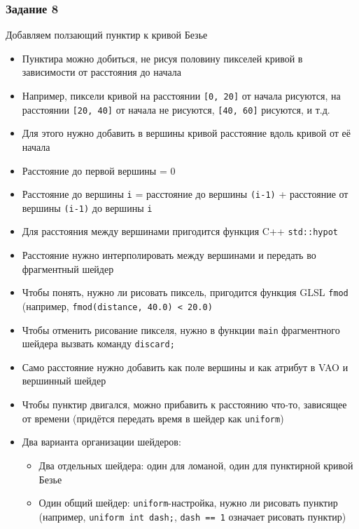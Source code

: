 \documentclass{beamer}
\begin{document}
\begin{frame}[fragile]
\frametitle{Задание 8}
\fontsize{8pt}{8pt}\selectfont
Добавляем ползающий пунктир к кривой Безье
\begin{itemize}
\item Пунктира можно добиться, не рисуя половину пикселей кривой в зависимости от расстояния до начала
\pause
\item Например, пиксели кривой на расстоянии \verb|[0, 20]| от начала рисуются, на расстоянии \verb|[20, 40]| от начала не рисуются, \verb|[40, 60]| рисуются, и т.д.
\pause
\item Для этого нужно добавить в вершины кривой расстояние вдоль кривой от её начала
\item Расстояние до первой вершины = 0
\item Расстояние до  вершины \verb|i| = расстояние до  вершины \verb|(i-1)| + расстояние от вершины \verb|(i-1)| до вершины \verb|i|
\item Для расстояния между вершинами пригодится функция C++ \verb|std::hypot|
\pause
\item Расстояние нужно интерполировать между вершинами и передать во фрагментный шейдер
\item Чтобы понять, нужно ли рисовать пиксель, пригодится функция GLSL \verb|fmod| (например, \verb|fmod(distance, 40.0) < 20.0)|
\item Чтобы отменить рисование пикселя, нужно в функции \verb|main| фрагментного шейдера вызвать команду \verb|discard;|
\pause
\item Само расстояние нужно добавить как поле вершины и как атрибут в VAO и вершинный шейдер
\pause
\item Чтобы пунктир двигался, можно прибавить к расстоянию что-то, зависящее от времени (придётся передать время в шейдер как \verb|uniform|)
\pause
\item Два варианта организации шейдеров:
\begin{itemize}
\item Два отдельных шейдера: один для ломаной, один для пунктирной кривой Безье
\item Один общий шейдер: \verb|uniform|-настройка, нужно ли рисовать пунктир (например, \verb|uniform int dash;|, \verb|dash == 1| означает рисовать пунктир)
\end{itemize}
\end{itemize}
\end{frame}
\end{document}
